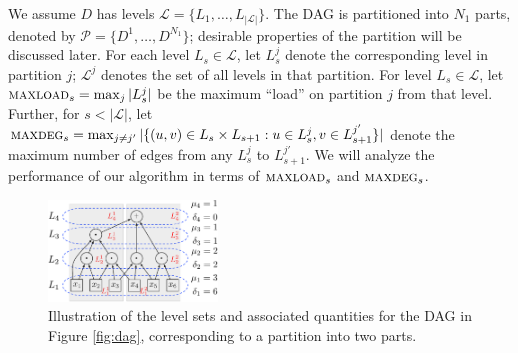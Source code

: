 We assume $D$ has levels $\mathcal{L} = \{L_1,\ldots,L_{|\mathcal{L}|}\}$. 
The DAG is partitioned into $N_1$ parts, denoted by
$\mathcal{P}=\{D^1, \ldots, D^{N_1}\}$; desirable properties of
the partition will be discussed later.
For each level $L_s\in\mathcal{L}$, let $L_s^j$ denote the corresponding level
in partition $j$; $\mathcal{L}^j$ denotes the set of all levels in that partition.
For level $L_s\in\mathcal{L}$, let $\textsc{maxload}{}_s = \max_j |L_s^j|$ be the maximum
``load'' on partition $j$ from that level. Further, for $s<|\mathcal{L}|$, let
$\textsc{maxdeg}{}_s = \max_{j\neq j'} |\{(u, v)\in L_s\times L_{s+1}: u\in L_s^j, v\in L_{s+1}^{j'}\}|$
denote the maximum number of edges from any $L_s^j$ to $L_{s+1}^{j'}$.
We will analyze the performance of our algorithm in terms of $\textsc{maxload}{}_s$ and $\textsc{maxdeg}{}_s$.

\begin{figure}[h]
\includegraphics[width=0.4\textwidth]{img/dag4.pdf}
\caption{
\small
Illustration of the level sets and associated quantities for the DAG in
Figure \ref{fig:dag}, corresponding to a partition into two parts. 
}
\label{fig:dag4}
\end{figure}

